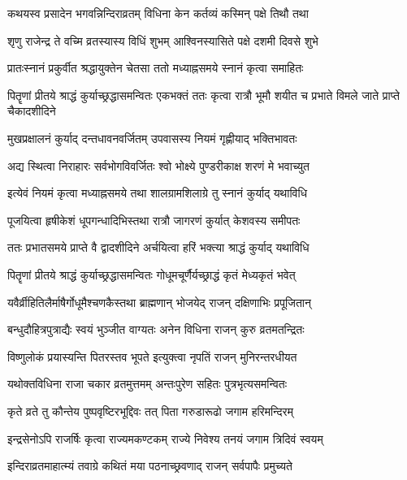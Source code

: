 \twolineshloka
{कथयस्व प्रसादेन भगवन्निन्दिराव्रतम्}
{विधिना केन कर्तव्यं कस्मिन् पक्षे तिथौ तथा}%


\twolineshloka
{शृणु राजेन्द्र ते वच्मि व्रतस्यास्य विधिं शुभम्}
{आश्विनस्यासिते पक्षे दशमी दिवसे शुभे}%

\twolineshloka
{प्रातःस्नानं प्रकुर्वीत श्रद्धायुक्तेन चेतसा}
{ततो मध्याह्नसमये स्नानं कृत्वा समाहितः}%

\threelineshloka
{पितॄणां प्रीतये श्राद्धं कुर्याच्छ्रद्धासमन्वितः}
{एकभक्तं ततः कृत्वा रात्रौ भूमौ शयीत च}
{प्रभाते विमले जाते प्राप्ते चैकादशीदिने}%

\twolineshloka
{मुखप्रक्षालनं कुर्याद् दन्तधावनवर्जितम्}
{उपवासस्य नियमं गृह्णीयाद् भक्तिभावतः}%

\twolineshloka
{अद्य स्थित्वा निराहारः सर्वभोगविवर्जितः}
{श्वो भोक्ष्ये पुण्डरीकाक्ष शरणं मे भवाच्युत}%

\twolineshloka
{इत्येवं नियमं कृत्वा मध्याह्नसमये तथा}
{शालग्रामशिलाग्रे तु स्नानं कुर्याद् यथाविधि}%

\twolineshloka
{पूजयित्वा हृषीकेशं धूपगन्धादिभिस्तथा}
{रात्रौ जागरणं कुर्यात् केशवस्य समीपतः}%

\twolineshloka
{ततः प्रभातसमये प्राप्ते वै द्वादशीदिने}
{अर्चयित्वा हरिं भक्त्या श्राद्धं कुर्याद् यथाविधि}%

\twolineshloka
{पितॄणां प्रीतये श्राद्धं कुर्याच्छ्रद्धासमन्वितः}
{गोधूमचूर्णैर्यच्छ्राद्धं कृतं मेध्यकृतं भवेत्}%

\twolineshloka
{यवैर्व्रीहितिलैर्माषैर्गोधूमैश्चणकैस्तथा}
{ब्राह्मणान् भोजयेद् राजन् दक्षिणाभिः प्रपूजितान्}%

\twolineshloka
{बन्धुदौहित्रपुत्राद्यैः स्वयं भुञ्जीत वाग्यतः}
{अनेन विधिना राजन् कुरु व्रतमतन्द्रितः}%

\twolineshloka
{विष्णुलोकं प्रयास्यन्ति पितरस्तव भूपते}
{इत्युक्त्वा नृपतिं राजन् मुनिरन्तरधीयत}%

\twolineshloka
{यथोक्तविधिना राजा चकार व्रतमुत्तमम्}
{अन्तःपुरेण सहितः पुत्रभृत्यसमन्वितः}%

\twolineshloka
{कृते व्रते तु कौन्तेय पुष्पवृष्टिरभूद्दिवः}
{तत् पिता गरुडारूढो जगाम हरिमन्दिरम्}%

\twolineshloka
{इन्द्रसेनोऽपि राजर्षिः कृत्वा राज्यमकण्टकम्}
{राज्ये निवेश्य तनयं जगाम त्रिदिवं स्वयम्}%

\twolineshloka
{इन्दिराव्रतमाहात्म्यं तवाग्रे कथितं मया}
{पठनाच्छ्रवणाद् राजन् सर्वपापैः प्रमुच्यते}%

